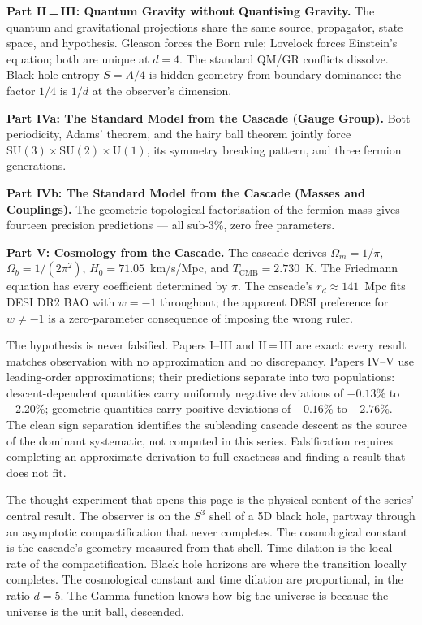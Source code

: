 \documentclass[12pt,a4paper]{article}
\begin{document}
\textbf{Part II\,=\,III: Quantum Gravity without Quantising Gravity.} The quantum and
gravitational projections share the same source, propagator, state space, and hypothesis.
Gleason forces the Born rule; Lovelock forces Einstein's equation; both are unique at
$d = 4$. The standard QM/GR conflicts dissolve. Black hole entropy $S = A/4$ is hidden
geometry from boundary dominance: the factor $1/4$ is $1/d$ at the observer's dimension.

\textbf{Part IVa: The Standard Model from the Cascade (Gauge Group).} Bott periodicity,
Adams' theorem, and the hairy ball theorem jointly force
$\mathrm{SU}(3)\times\mathrm{SU}(2)\times\mathrm{U}(1)$, its symmetry breaking pattern,
and three fermion generations.

\textbf{Part IVb: The Standard Model from the Cascade (Masses and Couplings).} The
geometric-topological factorisation of the fermion mass gives fourteen precision
predictions --- all sub-3\%, zero free parameters.

\textbf{Part V: Cosmology from the Cascade.} The cascade derives $\Omega_m = 1/\pi$,
$\Omega_b = 1/(2\pi^2)$, $H_0 = 71.05$~km/s/Mpc, and $T_{\mathrm{CMB}} = 2.730$~K. The
Friedmann equation has every coefficient determined by $\pi$. The cascade's
$r_d\approx 141$~Mpc fits DESI DR2 BAO with $w = -1$ throughout; the apparent DESI
preference for $w\neq -1$ is a zero-parameter consequence of imposing the wrong ruler.

\bigskip

The hypothesis is never falsified. Papers I--III and II\,=\,III are exact: every result
matches observation with no approximation and no discrepancy. Papers IV--V use
leading-order approximations; their predictions separate into two populations:
descent-dependent quantities carry uniformly negative deviations of $-0.13\%$ to
$-2.20\%$; geometric quantities carry positive deviations of $+0.16\%$ to $+2.76\%$.
The clean sign separation identifies the subleading cascade descent as the source of
the dominant systematic, not computed in this series. Falsification requires completing
an approximate derivation to full exactness and finding a result that does not fit.

\bigskip

The thought experiment that opens this page is the physical content of the series'
central result. The observer is on the $S^3$ shell of a 5D black hole, partway through
an asymptotic compactification that never completes. The cosmological constant is the
cascade's geometry measured from that shell. Time dilation is the local rate of the
compactification. Black hole horizons are where the transition locally completes. The
cosmological constant and time dilation are proportional, in the ratio $d = 5$. The
Gamma function knows how big the universe is because the universe is the unit ball,
descended.
\end{document}
